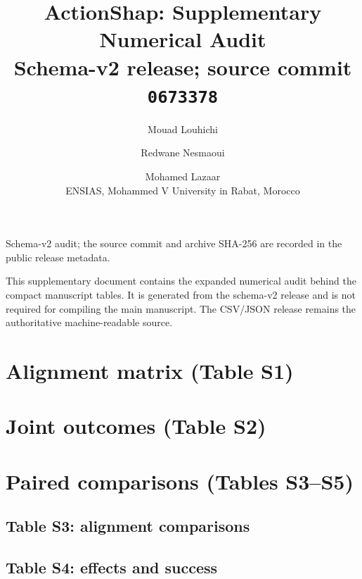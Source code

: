 \documentclass[10pt]{article}
\newenvironment{auditlandscape}{\begin{landscape}}{\end{landscape}}
\begin{document}
\title{ActionShap: Supplementary Numerical Audit\\[3pt]
\large Schema-v2 release; source commit \texttt{0673378}}
\author{Mouad Louhichi \and Redwane Nesmaoui \and Mohamed Lazaar\\
\small ENSIAS, Mohammed V University in Rabat, Morocco}
\date{}
\maketitle
\begin{center}\small Schema-v2 audit; the source commit and archive SHA-256 are recorded in the public release metadata.\end{center}

This supplementary document contains the expanded numerical audit behind the
compact manuscript tables. It is generated from the schema-v2 release and is
not required for compiling the main manuscript. The CSV/JSON release remains
the authoritative machine-readable source.

\clearpage
\appendix
\setcounter{section}{0}
\renewcommand{\thesection}{S\arabic{section}}
\renewcommand{\thetable}{S\arabic{table}}
\section{Alignment matrix (Table S1)}
\begingroup\small

\endgroup
\section{Joint outcomes (Table S2)}
\begin{auditlandscape}
\begingroup\scriptsize\setlength{\tabcolsep}{2pt}

\endgroup
\end{auditlandscape}
\clearpage
\section{Paired comparisons (Tables S3--S5)}
\subsection*{Table S3: alignment comparisons}
\begin{auditlandscape}
\begingroup\scriptsize\setlength{\tabcolsep}{2pt}

\endgroup
\end{auditlandscape}
\subsection*{Table S4: effects and success}
\begin{auditlandscape}
\begingroup\scriptsize\setlength{\tabcolsep}{2pt}

\endgroup
\end{auditlandscape}
\end{document}
